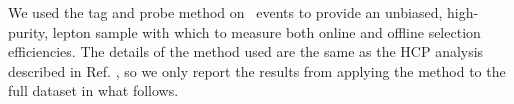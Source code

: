  
We used the tag and probe method on \dyll~events to provide an unbiased, high-purity, 
lepton sample with which to measure both online and offline selection efficiencies.
The details of the method used are the same as the HCP analysis described
in Ref. \cite{hcp2012Note}, so we only report the results from 
applying the method to the full dataset in what follows.

